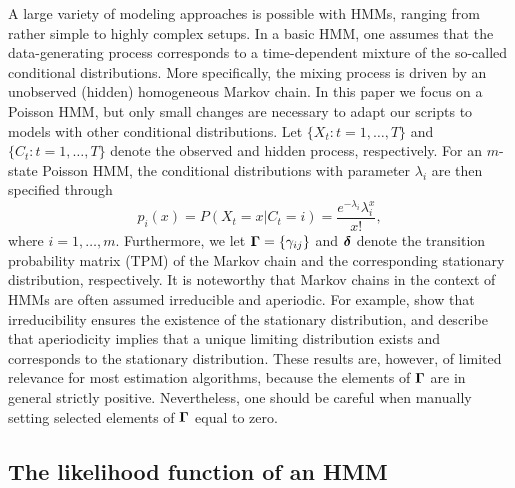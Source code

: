 \documentclass[bimj,fleqn]{w-art}\usepackage[]{graphicx}\usepackage[]{color}
\newcommand{\bgamma}{\mbox{\boldmath $\Gamma$}}
\newcommand{\bfdelta}{\mbox{\boldmath $\delta$}}
\theoremstyle{plain}
\theoremstyle{definition}
\begin{document}
A large variety of modeling approaches is possible with HMMs, ranging from rather simple to highly complex setups.
In a basic HMM, one assumes that the data-generating process corresponds to a time-dependent mixture of the so-called conditional distributions.
More specifically, the mixing process is driven by an unobserved (hidden) homogeneous Markov chain.
In this paper we focus on a Poisson HMM, but only small changes are necessary to adapt our scripts to models with other conditional distributions.
Let $\{X_t: t = 1, \ldots, T\}$ and $\{C_t : t = 1, \ldots, T\}$ denote the observed and hidden process, respectively.
For an $m$-state Poisson HMM, the conditional distributions with parameter $\lambda_i$ are then specified through
\begin{equation*}
p_i(x) = P(X_t = x \vert C_t = i) = \frac{e^{-\lambda_i} \lambda_i^x}{x!},
\end{equation*}
where $i = 1, \ldots, m$. Furthermore, we let $\bgamma = \{\gamma_{ij}\}$ and $\bfdelta$ denote the transition probability matrix (TPM) of the Markov chain and the corresponding stationary distribution, respectively.
It is noteworthy that Markov chains in the context of HMMs are often assumed irreducible and aperiodic.
For example,
\citet[Lemma 6.3.5 on p. ~225 and Theorem 6.4.3 on p. ~227]{grimmett} show that irreducibility ensures the existence of the stationary distribution, and \citet[p. ~394]{feller} describe that aperiodicity implies that a unique limiting distribution exists and corresponds to the stationary distribution.
These results are, however, of limited relevance for most estimation algorithms, because the elements of $\bgamma$ are in general strictly positive. Nevertheless, one should be careful when manually setting selected elements of $\bgamma$ equal to zero.



\subsection{The likelihood function of an HMM}
\label{sec:hmm_likelihood}
\end{document}
